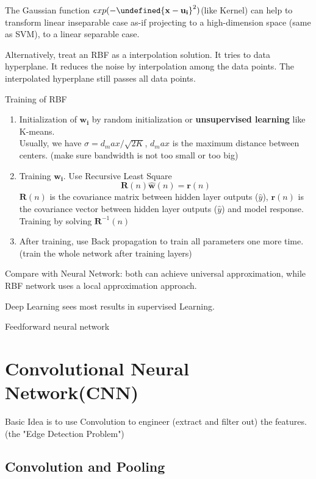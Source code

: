 \documentclass[11pt, openany]{book}              %
\let\norm\undefined %
\DeclarePairedDelimiter\norm{\lVert}{\rVert}
\begin{document}
The Gaussian function $exp(-\norm{\mathbf{x} - \mathbf{u_i}}^2)$(like Kernel) can help to transform linear inseparable case as-if projecting to a high-dimension space (same as SVM), to a linear separable case.

Alternatively, treat an RBF as a interpolation solution. It tries to data hyperplane. It reduces the noise by interpolation among the data points. The interpolated hyperplane still passes all data points. 

Training of RBF

\begin{enumerate}
	\item Initialization of $\mathbf{w_i}$ by random initialization or \textbf{unsupervised learning} like K-means. \\ Usually, we have $\sigma = d_max/\sqrt{2K}$, $d_max$ is the maximum distance between centers. (make sure bandwidth is not too small or too big)
	\item Training $\mathbf{w_i}$. Use Recursive Least Square 
	$$\mathbf{R}(n)\mathbf{\hat{w}}(n) = \mathbf{r}(n)$$
	$\mathbf{R}(n)$ is the covariance matrix between hidden layer outputs ($\hat{y}$), $\mathbf{r}(n)$ is the covariance vector between hidden layer outputs ($\hat{y}$) and model response. \\
		Training by solving $\mathbf{R}^{-1}(n)$
	\item After training, use Back propagation to train all parameters one more time. (train the whole network after training layers)
\end{enumerate}

Compare with Neural Network: both can achieve universal approximation, while RBF network uses a local approximation approach. 

Deep Learning sees most results in supervised Learning.

Feedforward neural network 



\section{Convolutional Neural Network(CNN)}

Basic Idea is to use Convolution to engineer (extract and filter out) the features. (the "Edge Detection Problem")

\subsection{Convolution and Pooling}
\end{document}
